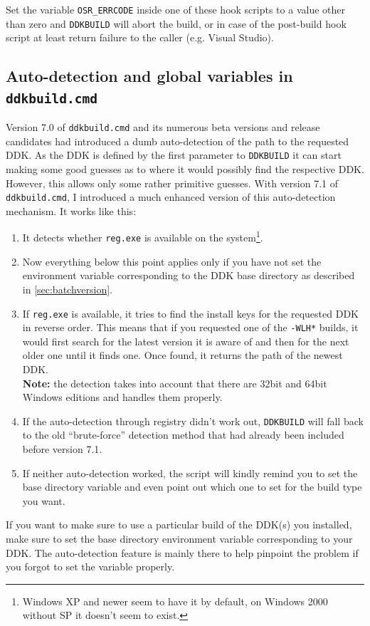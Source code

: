 \documentclass[a4paper,titlepage]{report}
\begin{document}
Set the variable \verb+OSR_ERRCODE+ inside one of these hook scripts to a value other than
zero and \texttt{DDKBUILD} will abort the build, or in case of the post-build hook script
at least return failure to the caller (e.g. Visual Studio).

\subsection{Auto-detection and global variables in \texttt{ddkbuild.cmd}}
Version 7.0 of \texttt{ddkbuild.cmd} and its numerous beta versions and release candidates
had introduced a dumb auto-detection of the path to the requested DDK. As the DDK is
defined by the first parameter to \texttt{DDKBUILD} it can start making some good guesses
as to where it would possibly find the respective DDK. However, this allows only some
rather primitive guesses. With version 7.1 of \texttt{ddkbuild.cmd}, I introduced a much
enhanced version of this auto-detection mechanism. It works like this:
\begin{enumerate}
  \item It detects whether \texttt{reg.exe} is available on the system\footnote{Windows XP
        and newer seem to have it by default, on Windows 2000 without SP it doesn't seem to
        exist.}.
  \item Now everything below this point applies only if you have not set the environment
        variable corresponding to the DDK base directory as described in \autoref{sec:batchversion}.
  \item If \texttt{reg.exe} is available, it tries to find the install keys for the
        requested DDK in reverse order. This means that if you requested one of the \verb+-WLH*+
        builds, it would first search for the latest version it is aware of and then for
        the next older one until it finds one. Once found, it returns the path of the newest DDK.\\
        \textbf{Note:} the detection takes into account that there are 32bit and 64bit Windows
        editions and handles them properly.
  \item If the auto-detection through registry didn't work out, \texttt{DDKBUILD} will fall back
        to the old ``brute-force'' detection method that had already been included before version 7.1.
  \item If neither auto-detection worked, the script will kindly remind you to set the base directory
        variable and even point out which one to set for the build type you want.
\end{enumerate}
If you want to make sure to use a particular build of the DDK(s) you installed, make sure to set the
base directory environment variable corresponding to your DDK. The auto-detection feature is mainly
there to help pinpoint the problem if you forgot to set the variable properly.
\end{document}
